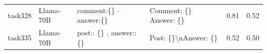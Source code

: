 \begin{longtable}{@{}p{0.8cm\tiny}p{1cm\tiny}p{4.1cm\ttfamily\tiny}p{4.1cm\ttfamily\tiny}p{0.8cm\tiny}p{0.8cm\tiny}@{}}
task328   & Llama-70B  & comment:\{\} -- answer:\{\}                                                                                                                                                                                                                                                                                                                                                                                                                                                                                             & Comment: \{\} Answer: \{\}                                                                                                                                                                                                                                                                                                                                                                                                                                                                                                                                                        & 0.81 & 0.52 \\
task335   & Llama-70B  & post:: \{\} , answer:: \{\}                                                                                                                                                                                                                                                                                                                                                                                                                                                                                             & Post: \{\}\textbackslash{}nAnswer: \{\}                                                                                                                                                                                                                                                                                                                                                                                                                                                                                                                                           & 0.52 & 0.50 \\

\end{longtable}
